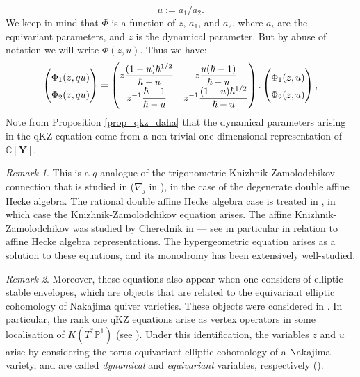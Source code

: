 \documentclass[a4paper]{report}
\theoremstyle{theorem}
\theoremstyle{definition}
\theoremstyle{remark}
\newtheorem{remark}{Remark}
\theoremstyle{proposition}
\theoremstyle{conjecture}
\theoremstyle{lemma}
\theoremstyle{corollary}
\theoremstyle{exercise}
\theoremstyle{example}
\newcommand{\C}{\mathbb{C}}
\begin{document}
  $$u:= a_1/a_2.$$
  We keep in mind that $\Phi$ is a function of $z$, $a_1$, and $a_2$, where $a_i$
  are the equivariant parameters, and $z$ is the dynamical parameter. But by 
  abuse of notation we will write $\Phi(z,u)$. Thus we have:
  \begin{equation}\label{eqn_qkz}
      \begin{pmatrix}
          \Phi_1(z,qu)\\
          \Phi_2(z,qu)
          \end{pmatrix} = 
          \renewcommand\arraystretch{1.5}\begin{pmatrix}
              z\displaystyle\frac{(1-u)\hbar^{1/2}}{\hbar - u} & z\displaystyle\frac{u(\hbar - 1)}{\hbar - u}\\
              z^{-1}\displaystyle\frac{\hbar - 1}{\hbar - u} & z^{-1}\displaystyle\frac{(1-u)\hbar^{1/2}}{\hbar-u}
          \end{pmatrix}.
      \begin{pmatrix}
          \Phi_1(z,u)\\
          \Phi_2(z,u)
      \end{pmatrix},
  \end{equation}
  Note from Proposition \ref{prop_qkz_daha} 
  that the dynamical parameters arising in the qKZ equation come from a non-trivial one-dimensional representation of 
  $\C[\mathbf{Y}]$.
  \begin{remark}
      This is a $q$-analogue of the trigonometric Knizhnik-Zamolodchikov connection
      that is studied in \cite{vv04} ($\nabla_j$ in \cite[Lemma 3.1(ii)]{vv04}), 
      in the case of the degenerate double affine Hecke algebra.
      The rational double affine Hecke algebra case is treated in \cite{ggor03},
      in which case the Knizhnik-Zamolodchikov equation arises.
      The affine Knizhnik-Zamolodchikov was studied by Cherednik in \cite{che90}
      --- see in particular \cite[(21)]{che90} in relation to affine Hecke algebra
      representations. The hypergeometric equation arises as a solution to these
      equations, and its monodromy has been extensively well-studied.
  \end{remark}
  
  \begin{remark}
      Moreover, these equations also appear when one considers of elliptic stable envelopes,
      which are objects that are related to the equivariant elliptic cohomology 
      of Nakajima quiver varieties. These objects were considered in \cite{ao16}.
      In particular, the rank one qKZ equations arise as vertex operators in
      some localisation of $K(T^\ast\mathbb{P}^1)$ (see \cite[\S 6]{ao16}). 
      Under this identification, the variables $z$ and $u$ arise by considering the 
      torus-equivariant elliptic cohomology of a Nakajima variety, and are called \emph{dynamical} and 
      \emph{equivariant} variables, respectively (\cite[(27)]{ao16}).
  \end{remark}
  
\end{document}
